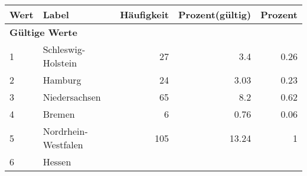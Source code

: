      \begin{longtable}{lXrrr}
     \toprule
     \textbf{Wert} & \textbf{Label} & \textbf{Häufigkeit} & \textbf{Prozent(gültig)} & \textbf{Prozent} \\
     \endhead
     \midrule
     \multicolumn{5}{l}{\textbf{Gültige Werte}}\\

     1 &
     \multicolumn{1}{X}{ Schleswig-Holstein   } &


       \num{27} &
       \num[round-mode=places,round-precision=2]{3,4} &
         \num[round-mode=places,round-precision=2]{0,26} \\

     2 &
     \multicolumn{1}{X}{ Hamburg   } &


       \num{24} &
       \num[round-mode=places,round-precision=2]{3,03} &
         \num[round-mode=places,round-precision=2]{0,23} \\

     3 &
     \multicolumn{1}{X}{ Niedersachsen   } &


       \num{65} &
       \num[round-mode=places,round-precision=2]{8,2} &
         \num[round-mode=places,round-precision=2]{0,62} \\

     4 &
     \multicolumn{1}{X}{ Bremen   } &


       \num{6} &
       \num[round-mode=places,round-precision=2]{0,76} &
         \num[round-mode=places,round-precision=2]{0,06} \\

     5 &
     \multicolumn{1}{X}{ Nordrhein-Westfalen   } &


       \num{105} &
       \num[round-mode=places,round-precision=2]{13,24} &
         \num[round-mode=places,round-precision=2]{1} \\

     6 &
     \multicolumn{1}{X}{ Hessen   } &



\end{longtable}

